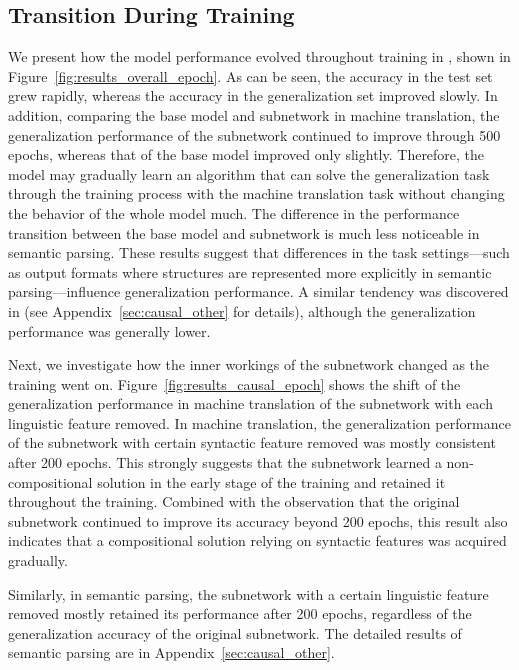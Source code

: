 

\subsection{Transition During Training}
We present how the model performance evolved throughout training in \dobjppiobjpp{}, shown in Figure~\ref{fig:results_overall_epoch}.
As can be seen, the accuracy in the test set grew rapidly, whereas the accuracy in the generalization set improved slowly.
In addition, comparing the base model and subnetwork in machine translation, the generalization performance of the subnetwork continued to improve through 500 epochs, whereas that of the base model improved only slightly.
Therefore, the model may gradually learn an algorithm that can solve the generalization task through the training process with the machine translation task without changing the behavior of the whole model much.
The difference in the performance transition between the base model and subnetwork is much less noticeable in semantic parsing.
These results suggest that differences in the task settings---such as output formats where structures are represented more explicitly in semantic parsing---influence generalization performance.
A similar tendency was discovered in \dobjppsubjpp{} (see Appendix~\ref{sec:causal_other} for details), although the generalization performance was generally lower.

Next, we investigate how the inner workings of the subnetwork changed as the training went on.
Figure~\ref{fig:results_causal_epoch} shows the shift of the generalization performance in machine translation of the subnetwork with each linguistic feature removed.
In machine translation, the generalization performance of the subnetwork with certain syntactic feature removed was mostly consistent after 200 epochs.
This strongly suggests that the subnetwork learned a non-compositional solution in the early stage of the training and retained it throughout the training.
Combined with the observation that the original subnetwork continued to improve its accuracy beyond 200 epochs, this result also indicates that a compositional solution relying on syntactic features was acquired gradually.

Similarly, in semantic parsing, the subnetwork with a certain linguistic feature removed mostly retained its performance after 200 epochs, regardless of the generalization accuracy of the original subnetwork.
The detailed results of semantic parsing are in Appendix~\ref{sec:causal_other}.



